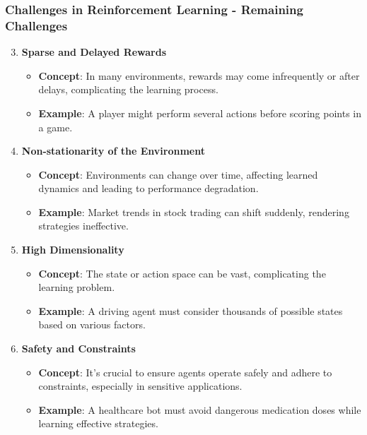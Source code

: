 \documentclass[aspectratio=169]{beamer}
\begin{document}
\begin{frame}[fragile]
  \frametitle{Challenges in Reinforcement Learning - Remaining Challenges}
  \begin{enumerate}
    \setcounter{enumi}{2}
    \item \textbf{Sparse and Delayed Rewards}
    \begin{itemize}
      \item \textbf{Concept}: In many environments, rewards may come infrequently or after delays, complicating the learning process.
      \item \textbf{Example}: A player might perform several actions before scoring points in a game.
    \end{itemize}

    \item \textbf{Non-stationarity of the Environment}
    \begin{itemize}
      \item \textbf{Concept}: Environments can change over time, affecting learned dynamics and leading to performance degradation.
      \item \textbf{Example}: Market trends in stock trading can shift suddenly, rendering strategies ineffective.
    \end{itemize}

    \item \textbf{High Dimensionality}
    \begin{itemize}
      \item \textbf{Concept}: The state or action space can be vast, complicating the learning problem.
      \item \textbf{Example}: A driving agent must consider thousands of possible states based on various factors.
    \end{itemize}

    \item \textbf{Safety and Constraints}
    \begin{itemize}
      \item \textbf{Concept}: It's crucial to ensure agents operate safely and adhere to constraints, especially in sensitive applications.
      \item \textbf{Example}: A healthcare bot must avoid dangerous medication doses while learning effective strategies.
    \end{itemize}
  \end{enumerate}
\end{frame}
\end{document}
